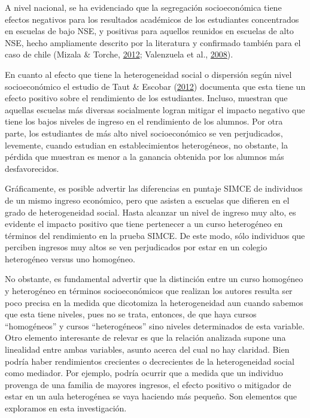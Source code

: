 \documentclass[
]{article}
\begin{document}
A nivel nacional, se ha evidenciado que la segregación socioeconómica
tiene efectos negativos para los resultados académicos de los
estudiantes concentrados en escuelas de bajo NSE, y positivas para
aquellos reunidos en escuelas de alto NSE, hecho ampliamente descrito
por la literatura y confirmado también para el caso de chile (Mizala \&
Torche, \protect\hyperlink{ref-mizala_bringing_2012}{2012}; Valenzuela
et al., \protect\hyperlink{ref-valenzuela_evolucion_2008}{2008}).

En cuanto al efecto que tiene la heterogeneidad social o dispersión
según nivel socioeconómico el estudio de Taut \& Escobar
(\protect\hyperlink{ref-taut_efecto_2012}{2012}) documenta que esta
tiene un efecto positivo sobre el rendimiento de los estudiantes.
Incluso, muestran que aquellas escuelas más diversas socialmente logran
mitigar el impacto negativo que tiene los bajos niveles de ingreso en el
rendimiento de los alumnos. Por otra parte, los estudiantes de más alto
nivel socioeconómico se ven perjudicados, levemente, cuando estudian en
establecimientos heterogéneos, no obstante, la pérdida que muestran es
menor a la ganancia obtenida por los alumnos más desfavorecidos.

Gráficamente, es posible advertir las diferencias en puntaje SIMCE de
individuos de un mismo ingreso económico, pero que asisten a escuelas
que difieren en el grado de heterogeneidad social. Hasta alcanzar un
nivel de ingreso muy alto, es evidente el impacto positivo que tiene
pertenecer a un curso heterogéneo en términos del rendimiento en la
prueba SIMCE. De este modo, sólo individuos que perciben ingresos muy
altos se ven perjudicados por estar en un colegio heterogéneo versus uno
homogéneo.

No obstante, es fundamental advertir que la distinción entre un curso
homogéneo y heterogéneo en términos socioeconómicos que realizan los
autores resulta ser poco precisa en la medida que dicotomiza la
heterogeneidad aun cuando sabemos que esta tiene niveles, pues no se
trata, entonces, de que haya cursos ``homogéneos'' y cursos
``heterogéneos'' sino niveles determinados de esta variable. Otro
elemento interesante de relevar es que la relación analizada supone una
linealidad entre ambas variables, asunto acerca del cual no hay
claridad. Bien podría haber rendimientos crecientes o decrecientes de la
heterogeneidad social como mediador. Por ejemplo, podría ocurrir que a
medida que un individuo provenga de una familia de mayores ingresos, el
efecto positivo o mitigador de estar en un aula heterogénea se vaya
haciendo más pequeño. Son elementos que exploramos en esta
investigación.
\end{document}
